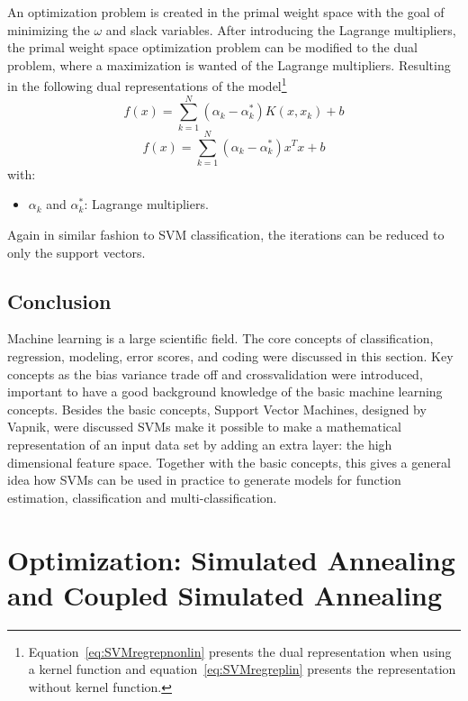 An optimization problem is created in the primal weight space with the goal of minimizing the $\omega$ and slack variables.
After introducing the Lagrange multipliers, the primal weight space optimization problem can be modified to the dual problem, where a maximization is wanted of the Lagrange multipliers.
Resulting in the following dual representations of the model\footnote{Equation~\ref{eq:SVMregrepnonlin} presents the dual representation when using a kernel function and equation~\ref{eq:SVMregreplin} presents the representation without kernel function. }
\begin{equation}
	f(x) = \sum_{k=1}^{N}(\alpha_k-\alpha_k^*)K(x,x_k) + b
	\label{eq:SVMregrepnonlin}
\end{equation}
\begin{equation}
	f(x) = \sum_{k=1}^{N}(\alpha_k-\alpha_k^*)x^Tx + b
	\label{eq:SVMregreplin}
\end{equation}
with:
\begin{itemize}
	\item $\alpha_k$ and $\alpha_k^*$: Lagrange multipliers.
\end{itemize}
Again in similar fashion to SVM classification, the iterations can be reduced to only the support vectors.
\subsection{Conclusion}
Machine learning is a large scientific field.
The core concepts of classification, regression, modeling, error scores, and coding were discussed in this section.
Key concepts as the bias variance trade off and crossvalidation were introduced, important to have a good background knowledge of the basic machine learning concepts.
Besides the basic concepts, Support Vector Machines, designed by Vapnik, were discussed
SVMs make it possible to make a mathematical representation of an input data set by adding an extra layer: the high dimensional feature space.
Together with the basic concepts, this gives a general idea how SVMs can be used in practice to generate models for function estimation, classification and multi-classification.
\section{Optimization: Simulated Annealing and Coupled Simulated Annealing}
